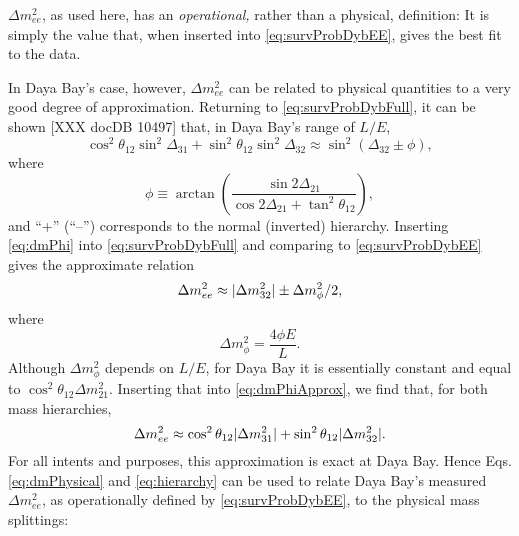 \documentclass[../thesis.tex]{subfiles}
\begin{document}
\(\Delta m^2_{ee}\), as used here, has an \emph{operational,} rather than a physical, definition: It is simply the value that, when inserted into \eqref{eq:survProbDybEE}, gives the best fit to the data.
%
\begin{comment}
  Note that, if Daya Bay only measured antineutrinos at a single $L/E$, we could instead have made a truly physical definition of $\Delta m^2_{ee}$ by declaring that \[ \sin^2 \Delta_{ee} \equiv \cos^2\theta_{12} \sin^2 \Delta_{31} + \sin^2\theta_{12} \sin^2 \Delta_{32}. \] However, the righthand side of this definition depends on $L/E$, so unless this dependence is shown to be negligible, it cannot be used in broadband analyses such as Daya Bay's.
\end{comment}
%
In Daya Bay's case, however, \(\Delta m^2_{ee}\) can be related to physical quantities to a very good degree of approximation. Returning to \eqref{eq:survProbDybFull}, it can be shown [XXX docDB 10497] that, in Daya Bay's range of $L/E$,
\begin{equation}
  \label{eq:dmPhi}
  \cos^2\theta_{12} \sin^2\Delta_{31} + \sin^2\theta_{12}\sin^2\Delta_{32}
  \approx \sin^2 (\Delta_{32} \pm \phi),
\end{equation}
where
\begin{equation*}
  \phi \equiv \arctan\left( \frac{\sin2\Delta_{21}}{\cos2\Delta_{21}+ \tan^2
      \theta_{12}} \right),
\end{equation*}
and ``+'' (``--'') corresponds to the normal (inverted) hierarchy. Inserting \eqref{eq:dmPhi} into \eqref{eq:survProbDybFull} and comparing to \eqref{eq:survProbDybEE} gives the approximate relation
\begin{equation}
  \label{eq:dmPhiApprox}
  \Delta m^2_{ee} \approx \lvert \Delta m^2_{32}\rvert \pm \Delta m^2_\phi/2,
\end{equation}
where
\begin{equation*}
  \Delta m^2_\phi = \frac{4\phi E}{L}.
\end{equation*}
Although $\Delta m^2_\phi$ depends on $L/E$, for Daya Bay it is essentially constant and equal to \(\cos^2\theta_{12}\Delta m^2_{21}\). Inserting that into \eqref{eq:dmPhiApprox}, we find that, for both mass hierarchies,
\begin{equation}
  \label{eq:dmPhysical}
  \Delta m^2_{ee} \approx \cos^2\theta_{12}\lvert \Delta m^2_{31}\rvert + \sin^2\theta_{12}\lvert \Delta m^2_{32}\rvert.
\end{equation}
For all intents and purposes, this approximation is exact at Daya Bay. Hence Eqs. \eqref{eq:dmPhysical} and \eqref{eq:hierarchy} can be used to relate Daya Bay's measured \(\Delta m^2_{ee}\), as operationally defined by \eqref{eq:survProbDybEE}, to the physical mass splittings:
\end{document}
